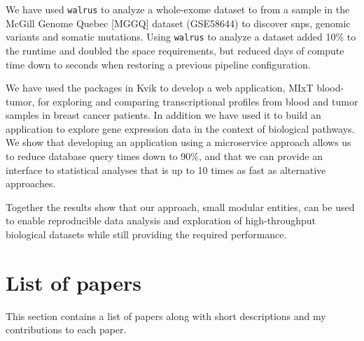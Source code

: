 We have used \texttt{walrus} to analyze a whole-exome dataset to from a sample
in the McGill Genome Quebec [MGGQ] dataset (GSE58644)\cite{tofigh2014prognostic}
to discover \glspl{snp}, genomic variants and somatic mutations. Using
\texttt{walrus} to analyze a dataset added 10\% to the runtime and doubled the
space requirements, but reduced days of compute time down to seconds when
restoring a previous pipeline configuration. 

We have used the packages in Kvik to develop a web application, MIxT
blood-tumor, for exploring and comparing transcriptional profiles from blood and
tumor samples in breast cancer patients.  In addition we have used it to build
an application to explore gene expression data in the context of biological
pathways. We show that developing an application using a microservice approach
allows us to reduce database query times down to 90\%, and that we can provide
an interface to statistical analyses that is up to 10 times as fast as
alternative approaches. 

Together the results show that our approach, small modular entities, can be used
to enable reproducible data analysis and exploration of high-throughput
biological datasets while still providing the required performance. 

\section{List of papers} 

This section contains a list of papers along with short descriptions and my
contributions to each paper. 

